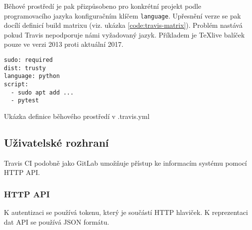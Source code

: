 Běhové prostředí je pak přizpůsobeno pro konkrétní projekt podle programovacího jazyka konfiguračním klíčem \verb|language|.
Upřesnění verze se pak docílí definicí build matrixu (viz. ukázka \ref{code:travis-matrix}).
Problém nastává pokud Travis nepodporuje námi vyžadovaný jazyk.
Příkladem je \TeX{}live balíček pouze ve verzi 2013 proti aktuální 2017.

\begin{listing}[ht]
\begin{verbatim}
sudo: required
dist: trusty
language: python
script:
  - sudo apt add ...
  - pytest
\end{verbatim}
\caption{Ukázka definice běhového prostředí v .travis.yml}
\end{listing}

\subsection{Uživatelské rozhraní}

Travis CI podobně jako GitLab umožňuje přístup ke informacím systému pomocí HTTP API.

\subsubsection{HTTP API}

K autentizaci se používá tokenu, který je součástí HTTP hlaviček.
K reprezentaci dat API se používá JSON formátu.

